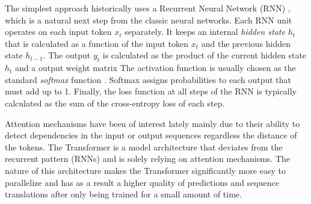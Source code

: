 The simplest approach historically uses a Recurrent Neural Network (RNN)
\citep{Rumelhart1986, Werbos1990, Hochreiter_1997}, which is a natural next step
from the classic neural networks. Each RNN unit operates on each input token
$x_t$ separately. It keeps an internal \emph{hidden state} $h_t$ that is
calculated as
a function of the input token $x_t$ and the previous hidden state $h_{t-1}$.
The output $y_t$ is calculated as
the product of the current hidden state $h_t$ and a output weight matrix The
activation function is usually chosen as the standard \emph{softmax} function
\citep{Nielsen2015-pu, Goodfellow-et-al-2016, Bishop-book-2006}. Softmax assigns
probabilities to each output that must add up to 1.
Finally, the loss function at all steps of the RNN is typically calculated as
the sum of the cross-entropy loss of each step.


Attention mechanisms have been of interest lately \citep{Bahdanau2015, Kim2017,
Vaswani_2017} mainly due to their ability to detect dependencies in the input or
output sequences regardless the distance of the tokens. The Transformer is a
model architecture that deviates from the recurrent pattern (\eg RNNs) and is
solely relying on attention mechanisms. The nature of this architecture makes
the Transformer significantly more easy to parallelize and has as a result a
higher quality of predictions and sequence translations after only being trained
for a small amount of time.

